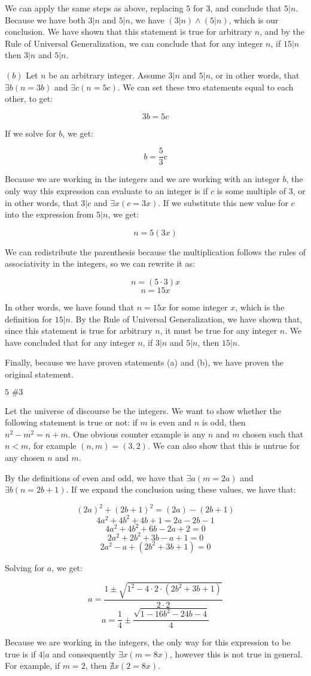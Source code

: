 \documentclass{article}
\newcommand{\problem}[2]{$\boxed{\text{#1 \##2}}$}
\newcommand{\subproblem}[1]{$\boxed{(#1)}$}
\newcommand{\RUG}{Rule of Universal Generalization}
\begin{document}
\begin{multicols*}{2}
We can apply the same steps as above, replacing $5$ for $3$, and
conclude that $5|n$. Because we have both $3|n$ and $5|n$, we have
$(3|n)\wedge(5|n)$, which is our conclusion. We have shown that this
statement is true for arbitrary $n$, and by the \RUG, we can conclude
that for any integer $n$, if $15|n$ then $3|n$ and $5|n$.

\subproblem{b} Let $n$ be an arbitrary integer. Assume $3|n$ and
$5|n$, or in other words, that $\exists{}b(n=3b)$ and
$\exists{}c(n=5c)$. We can set these two statements equal to each
other, to get:

\[
3b=5c
\]

If we solve for $b$, we get:

\[
b=\frac{5}{3}c
\]

Because we are working in the integers and we are working with an
integer $b$, the only way this expression can evaluate to an integer
is if $c$ is some multiple of $3$, or in other words, that $3|c$ and
$\exists{}x(c=3x)$. If we substitute this new value for $c$ into the
expression from $5|n$, we get:

\[
n=5(3x)
\]

We can redistribute the parenthesis because the multiplication follows
the rules of associativity in the integers, so we can rewrite it as:

\[
n=(5\cdot 3)x
\] \[
n=15x
\]

In other words, we have found that $n=15x$ for some integer $x$, which
is the definition for $15|n$. By the \RUG, we have shown that, since
this statement is true for arbitrary $n$, it must be true for any
integer $n$. We have concluded that for any integer $n$, if $3|n$ and
$5|n$, then $15|n$.

Finally, because we have proven statements (a) and (b), we have proven
the original statement.

\problem{5}{3}

Let the universe of discourse be the integers. We want to show whether
the following statement is true or not: if $m$ is even and $n$ is odd,
then $n^2-m^2=n+m$. One obvious counter example is any $n$ and $m$
chosen such that $n<m$, for example $(n,m)=(3,2)$. We can also show
that this is untrue for any chosen $n$ and $m$.

By the definitions of even and odd, we have that $\exists{}a(m=2a)$
and $\exists{}b(n=2b+1)$. If we expand the conclusion using these
values, we have that:

\[
(2a)^2+(2b+1)^2=(2a)-(2b+1)
\] \[
4a^2+4b^2+4b+1=2a-2b-1
\] \[
4a^2+4b^2+6b-2a+2=0
\] \[
2a^2+2b^2+3b-a+1=0
\] \[
2a^2-a+(2b^2+3b+1)=0
\]

Solving for $a$, we get:

\[
a=\dfrac{1\pm \sqrt{1^2-4\cdot 2\cdot (2b^2+3b+1)}}{2\cdot 2}
\] \[
a=\dfrac{1}{4}\pm\dfrac{\sqrt{1-16b^2-24b-4}}{4}
\]

Because we are working in the integers, the only way for this
expression to be true is if $4|a$ and consequently $\exists{}x(m=8x)$,
however this is not true in general. For example, if $m=2$, then
$\nexists{}x(2=8x)$.

\end{multicols*}
\end{document}
